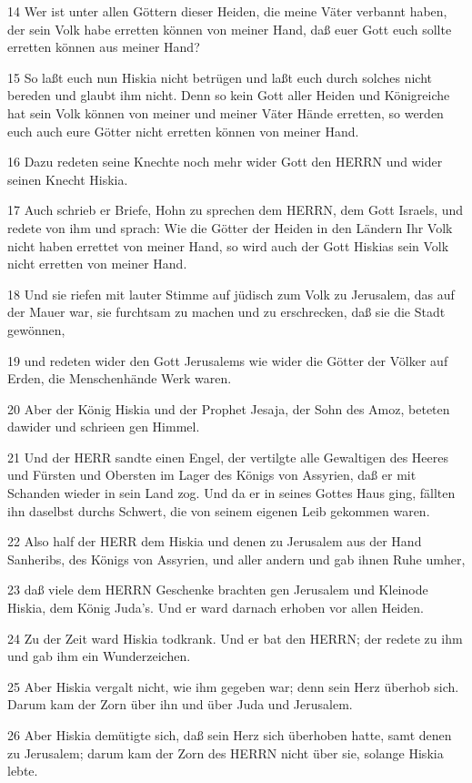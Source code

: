 \par 14 Wer ist unter allen Göttern dieser Heiden, die meine Väter verbannt haben, der sein Volk habe erretten können von meiner Hand, daß euer Gott euch sollte erretten können aus meiner Hand?
\par 15 So laßt euch nun Hiskia nicht betrügen und laßt euch durch solches nicht bereden und glaubt ihm nicht. Denn so kein Gott aller Heiden und Königreiche hat sein Volk können von meiner und meiner Väter Hände erretten, so werden euch auch eure Götter nicht erretten können von meiner Hand.
\par 16 Dazu redeten seine Knechte noch mehr wider Gott den HERRN und wider seinen Knecht Hiskia.
\par 17 Auch schrieb er Briefe, Hohn zu sprechen dem HERRN, dem Gott Israels, und redete von ihm und sprach: Wie die Götter der Heiden in den Ländern Ihr Volk nicht haben errettet von meiner Hand, so wird auch der Gott Hiskias sein Volk nicht erretten von meiner Hand.
\par 18 Und sie riefen mit lauter Stimme auf jüdisch zum Volk zu Jerusalem, das auf der Mauer war, sie furchtsam zu machen und zu erschrecken, daß sie die Stadt gewönnen,
\par 19 und redeten wider den Gott Jerusalems wie wider die Götter der Völker auf Erden, die Menschenhände Werk waren.
\par 20 Aber der König Hiskia und der Prophet Jesaja, der Sohn des Amoz, beteten dawider und schrieen gen Himmel.
\par 21 Und der HERR sandte einen Engel, der vertilgte alle Gewaltigen des Heeres und Fürsten und Obersten im Lager des Königs von Assyrien, daß er mit Schanden wieder in sein Land zog. Und da er in seines Gottes Haus ging, fällten ihn daselbst durchs Schwert, die von seinem eigenen Leib gekommen waren.
\par 22 Also half der HERR dem Hiskia und denen zu Jerusalem aus der Hand Sanheribs, des Königs von Assyrien, und aller andern und gab ihnen Ruhe umher,
\par 23 daß viele dem HERRN Geschenke brachten gen Jerusalem und Kleinode Hiskia, dem König Juda's. Und er ward darnach erhoben vor allen Heiden.
\par 24 Zu der Zeit ward Hiskia todkrank. Und er bat den HERRN; der redete zu ihm und gab ihm ein Wunderzeichen.
\par 25 Aber Hiskia vergalt nicht, wie ihm gegeben war; denn sein Herz überhob sich. Darum kam der Zorn über ihn und über Juda und Jerusalem.
\par 26 Aber Hiskia demütigte sich, daß sein Herz sich überhoben hatte, samt denen zu Jerusalem; darum kam der Zorn des HERRN nicht über sie, solange Hiskia lebte.
